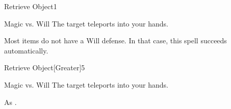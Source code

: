\begin{spellsection}{Retrieve Object}{1}
\begin{spellheader}
\end{spellheader}
\begin{spellcontent}
    \begin{spelltargetinginfo}
    \end{spelltargetinginfo}
    \begin{spelleffects}
        \begin{spellattack}{Magic vs. Will}
            \spellsuccess The target teleports into your hands.
        \end{spellattack}
    \end{spelleffects}
\end{spellcontent}
\begin{spellfooter}
    \spellnotes Most items do not have a Will defense. In that case, this spell succeeds automatically.
\end{spellfooter}
\end{spellsection}

\begin{spellsection}{Retrieve Object}[Greater]{5}
\begin{spellheader}
\end{spellheader}
\begin{spellcontent}
    \begin{spelltargetinginfo}
    \end{spelltargetinginfo}
    \begin{spelleffects}
        \begin{spellattack}{Magic vs. Will}
            \spelleffect The target teleports into your hands.
        \end{spellattack}
    \end{spelleffects}
\end{spellcontent}
\begin{spellfooter}
    \spellnotes As .
\end{spellfooter}
\end{spellsection}

